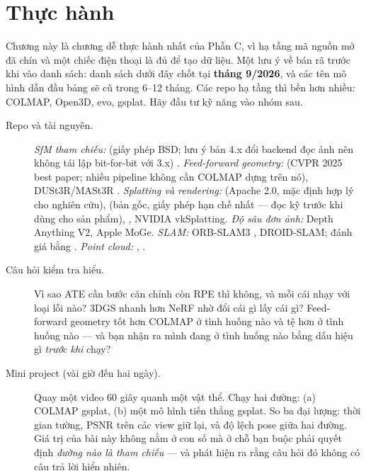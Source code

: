 \documentclass[../../deep_learning.tex]{subfiles}
\begin{document}
\section{Thực hành}
Chương này là chương dễ thực hành nhất của Phần C, vì hạ tầng mã nguồn mở đã chín và một chiếc điện thoại là đủ để tạo dữ liệu. Một lưu ý về bán rã trước khi vào danh sách: danh sách dưới đây chốt tại \textbf{tháng 9/2026}, và các tên mô hình dẫn đầu bảng sẽ cũ trong 6--12 tháng. Các repo hạ tầng thì bền hơn nhiều: COLMAP, Open3D, evo, gsplat. Hãy đầu tư kỹ năng vào nhóm sau.

\begin{description}
\item[Repo và tài nguyên.] \emph{SfM tham chiếu:}  (giấy phép BSD; lưu ý bản 4.x đổi backend đọc ảnh nên không tái lập bit-for-bit với 3.x) \cite{schoenberger2016colmap}. \emph{Feed-forward geometry:}  (CVPR 2025 best paper; nhiều pipeline không cần COLMAP dựng trên nó), DUSt3R/MASt3R \cite{wang2024dust3r}. \emph{Splatting và rendering:}  (Apache 2.0, mặc định hợp lý cho nghiên cứu),  (bản gốc, giấy phép hạn chế nhất --- đọc kỹ trước khi dùng cho sản phẩm), , NVIDIA vkSplatting. \emph{Độ sâu đơn ảnh:} Depth Anything V2, Apple MoGe. \emph{SLAM:} ORB-SLAM3 \cite{campos2021orbslam3}, DROID-SLAM; đánh giá bằng . \emph{Point cloud:} , .
\item[Câu hỏi kiểm tra hiểu.] Vì sao ATE cần bước căn chỉnh còn RPE thì không, và mỗi cái nhạy với loại lỗi nào? 3DGS nhanh hơn NeRF nhờ đổi cái gì lấy cái gì? Feed-forward geometry tốt hơn COLMAP ở tình huống nào và tệ hơn ở tình huống nào --- và bạn nhận ra mình đang ở tình huống nào bằng dấu hiệu gì \emph{trước khi} chạy?
\item[Mini project (vài giờ đến hai ngày).] Quay một video 60 giây quanh một vật thể. Chạy hai đường: (a) COLMAP \ra gsplat, (b) một mô hình tiến thẳng \ra gsplat. So ba đại lượng: thời gian tường, PSNR trên các view giữ lại, và độ lệch pose giữa hai đường. Giá trị của bài này không nằm ở con số mà ở chỗ bạn buộc phải quyết định \emph{đường nào là tham chiếu} --- và phát hiện ra rằng câu hỏi đó không có câu trả lời hiển nhiên.
\end{description}
\end{document}
